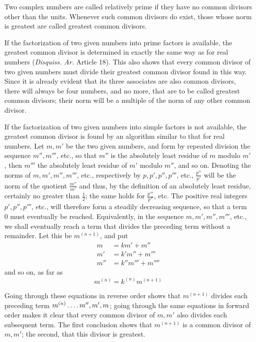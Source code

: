 Two complex numbers are called relatively prime if they have no common divisors other than the units. Whenever such common divisors do exist, those whose norm is greatest are called greatest common divisors.

If the factorization of two given numbers into prime factors is available, the greatest common divisor is determined in exactly the same way as for real numbers (\emph{Disquiss. Ar.} Article 18). This also shows that every common divisor of two given numbers must divide their greatest common divisor found in this way. Since it is already evident that its three associates are also common divisors, there will always be four numbers, and no
%
more, that are to be called greatest common divisors; their norm will be a multiple of the norm of any other common divisor.

If the factorization of two given numbers into simple factors is not available, the greatest common divisor is found by an algorithm similar to that for real numbers. Let $m,m'$ be the two given numbers, and form by repeated division the sequence $m'',m'''$, etc., so that $m''$ is the absolutely least residue of $m$ modulo $m'$, then $m'''$ the absolutely least residue of $m'$ modulo $m''$, and so on. Denoting the norms of $m,m',m'',m'''$, etc., respectively by $p,p',p'',p'''$, etc., $\frac{p''}{p'}$ will be the norm of the quotient $\frac{m''}{m'}$ and thus, by the definition of an absolutely least residue, certainly no greater than $\frac12$; the same holds for $\frac{p'''}{p''}$, etc. The positive real integers $p',p'',p'''$, etc., will therefore form a steadily decreasing sequence, so that a term $0$ must eventually be reached. Equivalently, in the sequence $m,m',m'',m'''$, etc., we shall eventually reach a term that divides the preceding term without a remainder. Let this be $m^{(n+1)}$, and put
\[
\begin{aligned}
m&=km'+m''\\
m'&=k'm''+m'''\\
m''&=k''m'''+m''''
\end{aligned}
\]
and so on, as far as
\[
m^{(n)}=k^{(n)}m^{(n+1)}
\]

Going through these equations in reverse order shows that $m^{(n+1)}$ divides each preceding term $m^{(n)}\mathinner{.\,.\,.\,.} m'',m',m$; going through the same equations in forward order makes it clear that every common divisor of $m,m'$ also divides each subsequent term. The first conclusion shows that $m^{(n+1)}$ is a common divisor of $m,m'$; the second, that this divisor is greatest.


